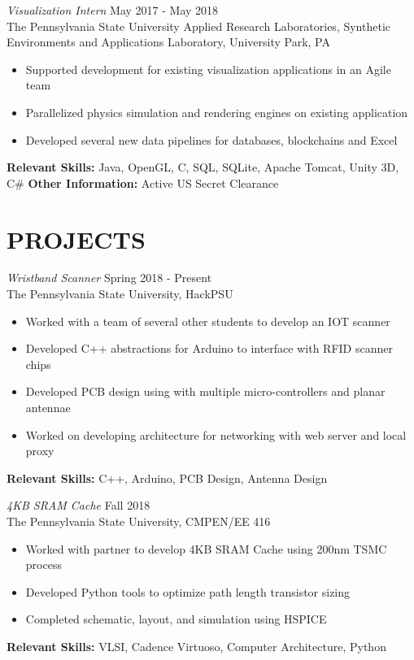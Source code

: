 \documentclass[line,margin]{res}
\begin{document}
\begin{resume}
		{\sl Visualization Intern} \hfill May 2017 - May 2018 \\
		The Pennsylvania State University Applied Research Laboratories, Synthetic Environments and Applications Laboratory, University Park, PA
		\begin{itemize}  \itemsep -2pt
			\item Supported development for existing visualization applications in an Agile team
			\item Parallelized physics simulation and rendering engines on existing application
			\item Developed several new data pipelines for databases, blockchains and Excel
			\vspace*{-\baselineskip}		
		\end{itemize}
		\textbf{Relevant Skills:} Java, OpenGL, C, SQL, SQLite, Apache Tomcat, Unity 3D, C\#
		\textbf{Other Information:} Active US Secret Clearance
		
		\section{PROJECTS}
		{\sl Wristband Scanner} \hfill Spring 2018 - Present\\
		The Pennsylvania State University, HackPSU
		\begin{itemize}  \itemsep -2pt
			\item Worked with a team of several other students to develop an IOT scanner
			\item Developed C++ abstractions for Arduino to interface with RFID scanner chips
			\item Developed PCB design using with multiple micro-controllers and planar antennae
			\item Worked on developing architecture for networking with web server and local proxy
		\end{itemize}
		\vspace*{-\baselineskip}		
		\textbf{Relevant Skills:} C++, Arduino, PCB Design, Antenna Design
		
		{\sl 4KB SRAM Cache} \hfill Fall 2018\\
		The Pennsylvania State University, CMPEN/EE 416
		\begin{itemize}  \itemsep -2pt
			\item Worked with partner to develop 4KB SRAM Cache using 200nm TSMC process
			\item Developed Python tools to optimize path length transistor sizing
			\item Completed schematic, layout, and simulation using HSPICE
			\vspace*{-\baselineskip}		
		\end{itemize}
		\textbf{Relevant Skills:} VLSI, Cadence Virtuoso, Computer Architecture, Python
		

\end{resume}
\end{document}
